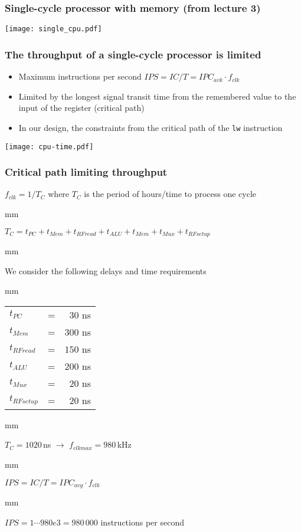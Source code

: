 \documentclass{beamer}
\begin{document}
\begin{frame}
\frametitle{Single-cycle processor with memory (from lecture 3)}
\texttt{[image: single\_cpu.pdf]}
\end{frame}

\begin{frame}
\frametitle{The throughput of a single-cycle processor is limited}

\begin{itemize}
 \item Maximum instructions per second $IPS = IC / T = IPC_{avk} \cdot f_{clk}$
 \item Limited by the longest signal transit time from the remembered value to the input of the register (critical path)
 \item In our design, the constraints from the critical path of the \texttt{lw} instruction
\end{itemize}

\texttt{[image: cpu-time.pdf]}
\end{frame}

\begin{frame}
\frametitle{Critical path limiting throughput}

$f_{clk} = 1 / T_{C}$ where $T_{C}$ is the period of hours/time to process one cycle

 mm

$T_{C} = t_{PC} + t_{Mem} + t_{RFread} + t_{ALU} + t_{Mem} + t_{Mux} + t_{RFsetup}$

 mm

We consider the following delays and time requirements

 mm

\begin{tabular}{l c r}
$t_{PC}$ & = & $30$ ns \\
$t_{Mem}$ & = & $300$ ns \\
$t_{RFread}$ & = & $150$ ns \\
$t_{ALU}$ & = & $200$ ns \\
$t_{Mux}$ & = & $20$ ns \\
$t_{RFsetup}$ & = & $20$ ns \\
\end{tabular}

 mm

$T_{C} = 1020$\,ns $\rightarrow$ $f_{clk max} = 980$\,kHz

 mm

$IPS = IC / T = IPC_{avg} \cdot f_{clk}$

 mm

$IPS = 1 \cdots 980e3 = 980\,000$ instructions per second

\end{frame}
\end{document}
